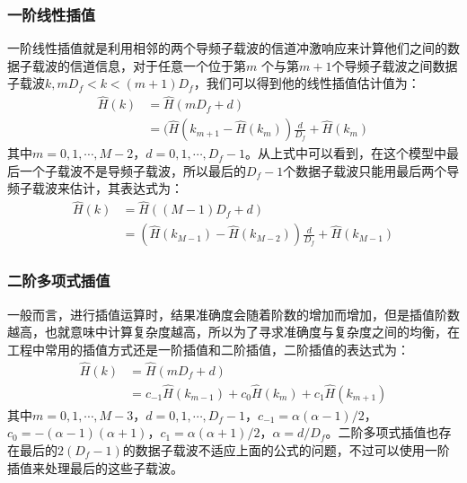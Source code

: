 \subsubsection{一阶线性插值}
一阶线性插值就是利用相邻的两个导频子载波的信道冲激响应来计算他们之间的数据子载波的信道信息，对于任意一个位于第$m$ 个与第$m+1$个导频子载波之间数据子载波$k, mD_f<k<(m+1)D_f$，我们可以得到他的线性插值估计值为\cite{sandell1996comparative}：
\begin{equation}
\begin{aligned}
\hat{H}(k)&=\hat{H}(mD_f+d) \\
&=(\hat{H}(k_{m+1}-\hat{H}(k_m))\frac{d}{D_f}+\hat{H}(k_m)
\end{aligned}
\end{equation}
其中$m=0,1,\cdots,M-2$，$d=0,1,\cdots,D_f-1$。从上式中可以看到，在这个模型中最后一个子载波不是导频子载波，所以最后的$D_f-1$个数据子载波只能用最后两个导频子载波来估计，其表达式为：
\begin{equation}
\begin{aligned}
\hat{H}(k) &= \hat{H}((M-1)D_f+d) \\
&= (\hat{H}(k_{M-1})-\hat{H}(k_{M-2}))\frac{d}{D_f}+\hat{H}(k_{M-1})
\end{aligned}
\end{equation}
\subsubsection{二阶多项式插值}
一般而言，进行插值运算时，结果准确度会随着阶数的增加而增加\cite{garcia2000pilot}，但是插值阶数越高，也就意味中计算复杂度越高，所以为了寻求准确度与复杂度之间的均衡，在工程中常用的插值方式还是一阶插值和二阶插值，二阶插值的表达式为：
\begin{equation}
\begin{aligned}
\hat{H}(k) &= \hat{H}(mD_f+d) \\
&=c_{-1}\hat{H}(k_{m-1})+c_0\hat{H}(k_m)+c_1\hat{H}(k_{m+1})
\end{aligned}
\end{equation}
其中$m=0,1,\cdots,M-3$，$d=0,1,\cdots,D_f-1$，$c_{-1}=\alpha(\alpha-1)/2$，
$c_0=-(\alpha-1)(\alpha+1)$，$c_1=\alpha(\alpha+1)/2$，$\alpha=d/D_f$。二阶多项式插值也存在最后的$2(D_f-1)$的数据子载波不适应上面的公式的问题，不过可以使用一阶插值来处理最后的这些子载波。
